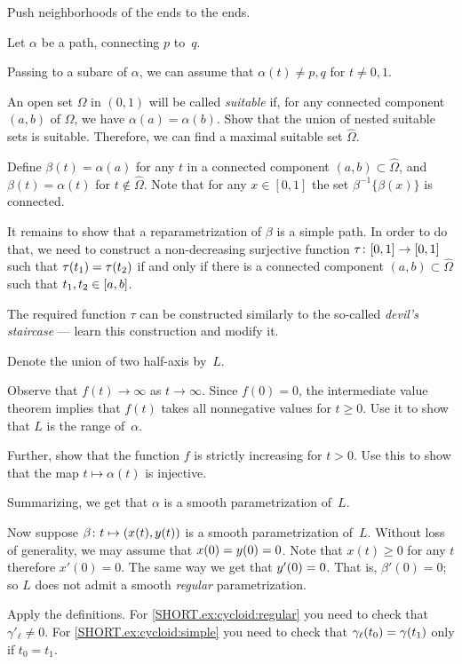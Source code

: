 \begin{multicols}{2}
Push neighborhoods of the ends to the ends.

Let $\alpha$ be a path, connecting $p$ to~$q$.

Passing to a subarc of $\alpha$,
we can assume that $\alpha(t)\ne p,q$ for $t\ne0,1$.

An open set $\Omega$ in $(0,1)$ will be called {}\emph{suitable}
if, for any connected component $(a,b)$ of $\Omega$, we have $\alpha(a)=\alpha(b)$.
Show that the union of nested suitable sets is suitable.
Therefore, we can find a maximal suitable set $\hat \Omega$.

Define $\beta(t)=\alpha(a)$ for any $t$ in a connected component $(a,b)\subset\hat \Omega$, and $\beta (t) = \alpha (t) $ for $t\notin\hat{\Omega}$.
Note that for any $x\in [0,1]$ the set $\beta^{-1}\{\beta(x)\}$ is connected.

It remains to show that a reparametrization of $\beta$ is a simple path.
In order to do that, we need to construct a non-decreasing surjective function $\tau\:[0,1]\z\to[0,1]$ such that 
$\tau(t_1)\z=\tau(t_2)$ if and only if there is a connected component $(a,b)\subset\hat \Omega$ such that $t_1,t_2\z\in [a,b]$.

The required function $\tau$ can be constructed similarly to the so-called {}\emph{devil's staircase} --- learn this construction and modify it.

Denote the union of two half-axis by~$L$.

Observe that $f(t)\to\infty$ as $t\to \infty$.
Since $f(0)=0$, the intermediate value theorem implies that $f(t)$ takes all nonnegative values for $t\ge 0$.
Use it to show that $L$ is the range of~$\alpha$.

Further, show that the function $f$ is strictly increasing for $t> 0$.
Use this to show that the map $t\mapsto \alpha(t)$ is injective.


Summarizing, we get that $\alpha$ is a smooth parametrization of~$L$. 

Now suppose $\beta\:t\z\mapsto (x(t),y(t))$ is a smooth parametrization of~$L$.
Without loss of generality, we may assume that $x(0)\z=y(0)=0$.
Note that $x(t)\ge 0$ for any $t$ therefore $x'(0)=0$.
The same way we get that $y'(0)\z=0$.
That is, $\beta'(0)=0$;
so $L$ does not admit a smooth \textit{regular} parametrization.

Apply the definitions.
For \ref{SHORT.ex:cycloid:regular} you need to check that $\gamma'_\ell\ne 0$.
For \ref{SHORT.ex:cycloid:simple} you need to check that $\gamma_\ell(t_0)\z=\gamma(t_1)$ only if $t_0=t_1$.


\end{multicols}
